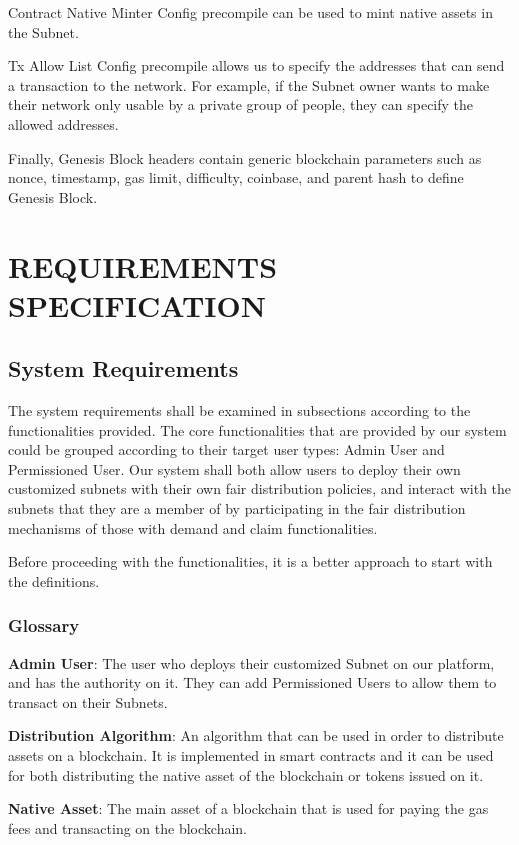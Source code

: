 \documentclass[a4paper,12pt]{report}
\begin{document}
Contract Native Minter Config precompile can be used to mint native assets in the Subnet. 

Tx Allow List Config precompile allows us to specify the addresses that can send a transaction to the network. For example, if the Subnet owner wants to make their network only usable by a private group of people, they can specify the allowed addresses.

Finally, Genesis Block headers contain generic blockchain parameters such as nonce, timestamp, gas limit, difficulty, coinbase, and parent hash to define Genesis Block.

\chapter{REQUIREMENTS SPECIFICATION}
\section{System Requirements}
The system requirements shall be examined in subsections according to the functionalities provided. The core functionalities that are provided by our system could be grouped according to their target user types: Admin User and Permissioned User. Our system shall both allow users to deploy their own customized subnets with their own fair distribution policies, and interact with the subnets that they are a member of by participating in the fair distribution mechanisms of those with demand and claim functionalities.

Before proceeding with the functionalities, it is a better approach to start with the definitions.

\subsection{Glossary}
\textbf{Admin User}: The user who deploys their customized Subnet on our platform, and has the authority on it. They can add Permissioned Users to allow them to transact on their Subnets.

\textbf{Distribution Algorithm}: An algorithm that can be used in order to distribute assets on a blockchain. It is implemented in smart contracts and it can be used for both distributing the native asset of the blockchain or tokens issued on it.

\textbf{Native Asset}:  The main asset of a blockchain that is used for paying the gas fees and transacting on the blockchain.

\newpage
\end{document}
